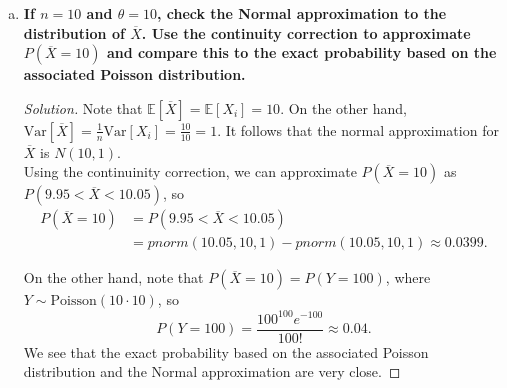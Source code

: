 \documentclass[11pt]{article}
\newenvironment{solution}
  {\renewcommand\qedsymbol{$\blacksquare$}\begin{proof}[Solution]}
  {\end{proof}}
\begin{document}
\begin{enumerate}
\begin{enumerate}[a)]
\begin{solution}
        Thus, Poisson$(\theta)$ is a $1$-parameter exponential family. 

        \hrulefill

        To find the Fisher information for $X_1, \dots, X_n$, we will use the second derivative formula. We found that
        \[
            \frac{\partial l}{\partial \theta} = -n + \frac{\sum x_i}{\theta}
        \]
        so
        \[
            \frac{\partial^2 l}{\partial \theta^2} = -\frac{\sum x_i}{\theta^2}.
        \]
        It follows that
        \[
            I_n(\theta) = -\mathbb{E}\left[ \frac{\partial^2 l}{\partial \theta^2} \right] = -\mathbb{E}\left[ -\frac{\sum x_i}{\theta^2} \right] = \frac{\mathbb{E}\left[ \sum x_i\right] }{\theta^2} = \frac{n}{\theta}.
        \]
        However, we also know that 
        \[
            \mathrm{Var} \left[\hat{\theta} \right] = \mathrm{Var} \left[\overline{X}  \right] = \frac{n\mathrm{Var} \left[X_i \right] }{n^2} = \frac{\theta}{n}.
        \]
        Thus, we conclude that  $\frac{1}{I_n(\theta)} = \mathrm{Var} \left[\hat{\theta} \right]$ so the reciprocal Fisher information gives the 
        exact variance of $\hat{\theta}$, as desired.
        \end{solution}
        
        \item \textbf{If $n = 10$ and $\theta = 10$, check the Normal approximation to the distribution of $\overline{X}$. Use the continuity
        correction to approximate $P(\overline{X} = 10)$ and compare this to the exact probability based on the associated Poisson distribution.}

        \begin{solution}
        Note that $\mathbb{E}\left[\overline{X}  \right] = \mathbb{E}\left[X_i \right] = 10$. On the other hand, $\mathrm{Var} \left[\overline{X}\right] = \frac{1}{n} \mathrm{Var} \left[X_i \right] = \frac{10}{10} = 1$. 
        It follows that the normal approximation for $\overline{X}$ is $N(10, 1)$. \\

        Using the continuinity correction, we can approximate $P(\overline{X} = 10)$ as $P(9.95 < \overline{X} < 10.05)$, so
        \begin{align*}
            P(\overline{X} = 10) &= P(9.95 < \overline{X} < 10.05) \\
            &= pnorm(10.05, 10, 1) - pnorm(10.05, 10, 1) \approx 0.0399.
        \end{align*}

        On the other hand, note that $P(\overline{X} = 10) = P(Y = 100)$, where $Y \sim \mathrm{Poisson}(10 \cdot 10)$, so
        \[
            P(Y = 100) = \frac{100^{100}e^{-100}}{100!} \approx 0.04.
        \]
        We see that the exact probability based on the associated Poisson distribution and the Normal approximation are very close.  
        \end{solution}



\end{enumerate}
\end{enumerate}
\end{document}
